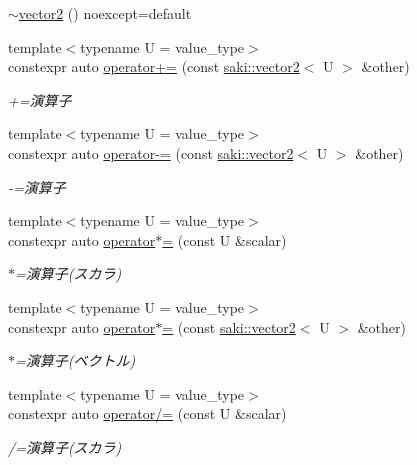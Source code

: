 \begin{DoxyCompactItemize}
\item 
\mbox{\hyperlink{classsaki_1_1vector2_a45296d8f66d1c5db0127b074f42a456f}{$\sim$vector2}} () noexcept=default
\item 
{\footnotesize template$<$typename U  = value\+\_\+type$>$ }\\constexpr auto \mbox{\hyperlink{classsaki_1_1vector2_a7d05381a39a16fd2b8a5bf48756101f3}{operator+=}} (const \mbox{\hyperlink{classsaki_1_1vector2}{saki\+::vector2}}$<$ U $>$ \&other)
\begin{DoxyCompactList}\small\item\em +=演算子 \end{DoxyCompactList}\item 
{\footnotesize template$<$typename U  = value\+\_\+type$>$ }\\constexpr auto \mbox{\hyperlink{classsaki_1_1vector2_a7812bbe241d7b5871f35da490fea19b4}{operator-\/=}} (const \mbox{\hyperlink{classsaki_1_1vector2}{saki\+::vector2}}$<$ U $>$ \&other)
\begin{DoxyCompactList}\small\item\em -\/=演算子 \end{DoxyCompactList}\item 
{\footnotesize template$<$typename U  = value\+\_\+type$>$ }\\constexpr auto \mbox{\hyperlink{classsaki_1_1vector2_a203906261424323192294dac71cc1f35}{operator$\ast$=}} (const U \&scalar)
\begin{DoxyCompactList}\small\item\em $\ast$=演算子(スカラ) \end{DoxyCompactList}\item 
{\footnotesize template$<$typename U  = value\+\_\+type$>$ }\\constexpr auto \mbox{\hyperlink{classsaki_1_1vector2_aec034723124adf2fd39736d4db3bb020}{operator$\ast$=}} (const \mbox{\hyperlink{classsaki_1_1vector2}{saki\+::vector2}}$<$ U $>$ \&other)
\begin{DoxyCompactList}\small\item\em $\ast$=演算子(ベクトル) \end{DoxyCompactList}\item 
{\footnotesize template$<$typename U  = value\+\_\+type$>$ }\\constexpr auto \mbox{\hyperlink{classsaki_1_1vector2_a5ee8bf11db397db036607f461455696c}{operator/=}} (const U \&scalar)
\begin{DoxyCompactList}\small\item\em /=演算子(スカラ) \end{DoxyCompactList}\item 

\end{DoxyCompactItemize}
